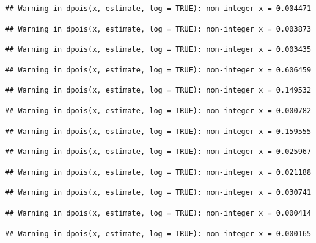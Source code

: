 \documentclass[]{article}
\begin{document}
\begin{verbatim}
## Warning in dpois(x, estimate, log = TRUE): non-integer x = 0.004471
\end{verbatim}

\begin{verbatim}
## Warning in dpois(x, estimate, log = TRUE): non-integer x = 0.003873
\end{verbatim}

\begin{verbatim}
## Warning in dpois(x, estimate, log = TRUE): non-integer x = 0.003435
\end{verbatim}

\begin{verbatim}
## Warning in dpois(x, estimate, log = TRUE): non-integer x = 0.606459
\end{verbatim}

\begin{verbatim}
## Warning in dpois(x, estimate, log = TRUE): non-integer x = 0.149532
\end{verbatim}

\begin{verbatim}
## Warning in dpois(x, estimate, log = TRUE): non-integer x = 0.000782
\end{verbatim}

\begin{verbatim}
## Warning in dpois(x, estimate, log = TRUE): non-integer x = 0.159555
\end{verbatim}

\begin{verbatim}
## Warning in dpois(x, estimate, log = TRUE): non-integer x = 0.025967
\end{verbatim}

\begin{verbatim}
## Warning in dpois(x, estimate, log = TRUE): non-integer x = 0.021188
\end{verbatim}

\begin{verbatim}
## Warning in dpois(x, estimate, log = TRUE): non-integer x = 0.030741
\end{verbatim}

\begin{verbatim}
## Warning in dpois(x, estimate, log = TRUE): non-integer x = 0.000414
\end{verbatim}

\begin{verbatim}
## Warning in dpois(x, estimate, log = TRUE): non-integer x = 0.000165
\end{verbatim}
\end{document}
